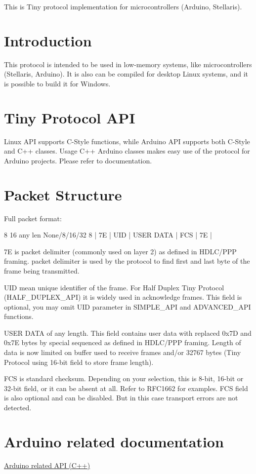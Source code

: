 This is Tiny protocol implementation for microcontrollers (Arduino, Stellaris).\hypertarget{index_introduction}{}\section{Introduction}\label{index_introduction}
This protocol is intended to be used in low-\/memory systems, like microcontrollers (Stellaris, Arduino). It is also can be compiled for desktop Linux systems, and it is possible to build it for Windows.\hypertarget{index_api}{}\section{Tiny Protocol A\+PI}\label{index_api}
Linux A\+PI supports C-\/\+Style functions, while Arduino A\+PI supports both C-\/\+Style and C++ classes. Usage C++ Arduino classes makes easy use of the protocol for Arduino projects. Please refer to documentation.\hypertarget{index_packet}{}\section{Packet Structure}\label{index_packet}
Full packet format\+: 
\begin{DoxyPre}
     8       16       any len    None/8/16/32     8
 |   7E   |  UID  |  USER DATA  |    FCS     |   7E   |
\end{DoxyPre}



\begin{DoxyItemize}
\item 7E is packet delimiter (commonly used on layer 2) as defined in H\+D\+L\+C/\+P\+PP framing. packet delimiter is used by the protocol to find first and last byte of the frame being transmitted.
\item U\+ID mean unique identifier of the frame. For Half Duplex Tiny Protocol (H\+A\+L\+F\+\_\+\+D\+U\+P\+L\+E\+X\+\_\+\+A\+PI) it is widely used in acknowledge frames. This field is optional, you may omit U\+ID parameter in S\+I\+M\+P\+L\+E\+\_\+\+A\+PI and A\+D\+V\+A\+N\+C\+E\+D\+\_\+\+A\+PI functions.
\item U\+S\+ER D\+A\+TA of any length. This field contains user data with replaced 0x7D and 0x7E bytes by special sequenced as defined in H\+D\+L\+C/\+P\+PP framing. Length of data is now limited on buffer used to receive frames and/or 32767 bytes (Tiny Protocol using 16-\/bit field to store frame length).
\item F\+CS is standard checksum. Depending on your selection, this is 8-\/bit, 16-\/bit or 32-\/bit field, or it can be absent at all. Refer to R\+F\+C1662 for examples. F\+CS field is also optional and can be disabled. But in this case transport errors are not detected.
\end{DoxyItemize}\hypertarget{index_arduino_section}{}\section{Arduino related documentation}\label{index_arduino_section}
\hyperlink{arduino}{Arduino related A\+PI (C++)} 